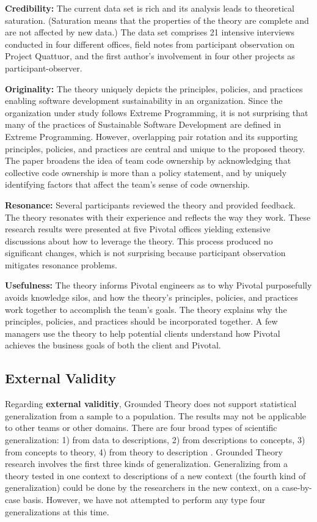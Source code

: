 \textbf{Credibility:} The current data set is rich and its analysis leads to theoretical saturation. (Saturation means that the properties of the theory are complete and are not affected by new data.) The data set comprises 21 intensive interviews conducted in four different offices, field notes from participant observation on Project Quattuor, and the first author’s involvement in four other projects as participant-observer.

\textbf{Originality:} The theory uniquely depicts the principles, policies, and practices enabling software development sustainability in an organization. Since the organization under study follows Extreme Programming, it is not surprising that many of the practices of Sustainable Software Development are defined in Extreme Programming. However, overlapping pair rotation and its supporting principles, policies, and practices are central and unique to the proposed theory. The paper broadens the idea of team code ownership by acknowledging that collective code ownership is more than a policy statement, and by uniquely identifying factors that affect the team’s sense of code ownership.

\textbf{Resonance:} Several participants reviewed the theory and provided feedback.
The theory resonates with their experience and reflects the way they work. These research results were presented at five Pivotal offices yielding extensive discussions about how to leverage the theory. This process produced no significant changes, which is not surprising because participant observation mitigates resonance problems.

\textbf{Usefulness:} The theory informs Pivotal engineers as to why Pivotal purposefully avoids knowledge silos, and how the theory’s principles, policies, and practices work together to accomplish the team’s goals. The theory explains why the principles, policies, and practices should be incorporated together. A few managers use  the theory to help potential clients understand how Pivotal achieves the business goals of both the client and Pivotal.


\subsection{External Validity}

Regarding \textbf{external validitiy}, Grounded Theory does not support statistical generalization from a sample to a population. The results may not be applicable to other teams or other domains. There are four broad types of scientific generalization: 1) from data to descriptions, 2) from descriptions to concepts, 3) from concepts to theory, 4) from theory to description \cite{Lee2003generalizing}. Grounded Theory research involves the first three kinds of generalization. Generalizing from a theory tested in one context to descriptions of a new context (the fourth kind of generalization) could be done by the researchers in the new context, on a case-by-case basis. However, we have not attempted to perform any type four generalizations at this time.

